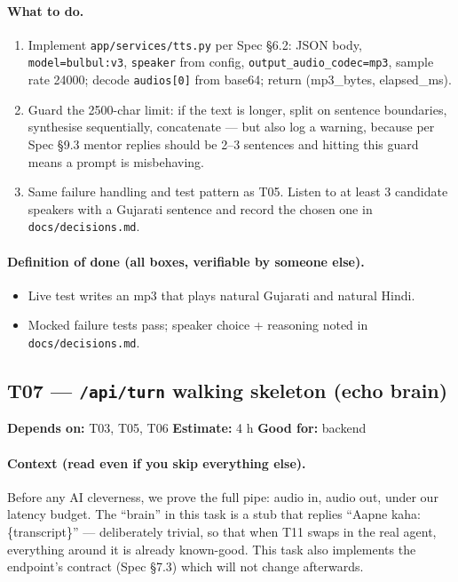 \documentclass[11pt]{article}
\newcommand{\code}[1]{\texttt{#1}}
\newcommand{\taskmeta}[3]{\noindent\textbf{Depends on:} #1 \quad\textbullet\quad \textbf{Estimate:} #2 \quad\textbullet\quad \textbf{Good for:} #3\par\vspace{2pt}}
\newcommand{\ctx}[1]{\paragraph{Context (read even if you skip everything else).} #1}
\newcommand{\dod}{\paragraph{Definition of done (all boxes, verifiable by someone else).}}
\begin{document}
\paragraph{What to do.}
\begin{enumerate}
  \item Implement \code{app/services/tts.py} per Spec \S6.2: JSON body, \code{model=bulbul:v3}, \code{speaker} from config, \code{output\_audio\_codec=mp3}, sample rate 24000; decode \code{audios[0]} from base64; return (mp3\_bytes, elapsed\_ms).
  \item Guard the 2500-char limit: if the text is longer, split on sentence boundaries, synthesise sequentially, concatenate --- but also log a warning, because per Spec \S9.3 mentor replies should be 2--3 sentences and hitting this guard means a prompt is misbehaving.
  \item Same failure handling and test pattern as T05. Listen to at least 3 candidate speakers with a Gujarati sentence and record the chosen one in \code{docs/decisions.md}.
\end{enumerate}
\dod
\begin{itemize}
  \item Live test writes an mp3 that plays natural Gujarati and natural Hindi.
  \item Mocked failure tests pass; speaker choice + reasoning noted in \code{docs/decisions.md}.
\end{itemize}

\subsection{T07 --- \code{/api/turn} walking skeleton (echo brain)}
\taskmeta{T03, T05, T06}{4 h}{backend}
\ctx{Before any AI cleverness, we prove the full pipe: audio in, audio out, under our latency budget. The ``brain'' in this task is a stub that replies ``Aapne kaha: \{transcript\}'' --- deliberately trivial, so that when T11 swaps in the real agent, everything around it is already known-good. This task also implements the endpoint's contract (Spec \S7.3) which will not change afterwards.}
\end{document}
